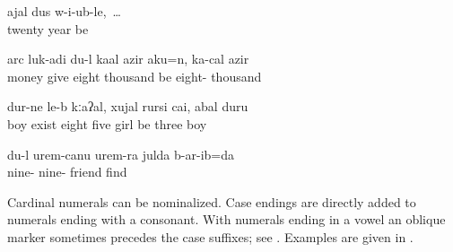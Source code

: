 \ea\label{ex:whenIwas20yearsold}
\gll	\vuvfr ajal dus w-i\uvfr-ub-le,~\ldots\\
	twenty year be\\
\glt	{}
\z

\ea\label{ex:Iwouldhavegivenhimmoney}
\gll	arc luk\lmk-adi du-l k\lmk a\glpl al azir ak\lmk u=n, k\lmk a\glpl-c\ej al azir\\
	money give  eight thousand be eight- thousand\\
\glt	{}
\z

\ea\label{ex:childrenarethere10}
\gll	dur\phfr-ne le-b kːaʔal, xujal rurs\lmk i cai, \eppl a\pha bal dur\phfr u\pha\\
	boy exist eight five girl be three boy\\
\glt	{}
\z

\ea\label{ex:Ifound99friends}
\gll	du-l ur\paaf\ej em-c\ej anu ur\paaf\ej em-ra {julda\pafr} b-ar\paaf\lmk-ib=da\\
	 nine- nine- friend find\\
\glt	{}
\z

Cardinal numerals can be nominalized. Case endings are directly added to numerals ending with a consonant. With numerals ending in a vowel an oblique marker  sometimes precedes the case suffixes; see . Examples are given in .


